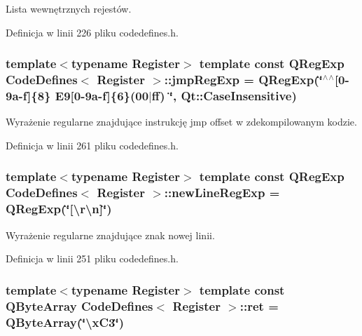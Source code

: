 Lista wewnętrznych rejestów. 



Definicja w linii 226 pliku codedefines.\-h.

\hypertarget{class_code_defines_a2f214288be4f17edf89f463162c59e30}{
\subsubsection[{jmp\-Reg\-Exp}]{\setlength{\rightskip}{0pt plus 5cm}template$<$typename Register$>$ template const Q\-Reg\-Exp {\bf Code\-Defines}$<$ Register $>$\-::jmp\-Reg\-Exp = Q\-Reg\-Exp(\char`\"{}$^\wedge$$^\wedge$\mbox{[}0-\/9a-\/f\mbox{]}\{8\} E9\mbox{[}0-\/9a-\/f\mbox{]}\{6\}(00$|$ff) \char`\"{}, Qt\-::\-Case\-Insensitive)\hspace{0.3cm}{\ttfamily [static]}}}\label{class_code_defines_a2f214288be4f17edf89f463162c59e30}


Wyrażenie regularne znajdujące instrukcję jmp offset w zdekompilowanym kodzie. 



Definicja w linii 261 pliku codedefines.\-h.

\hypertarget{class_code_defines_a767cf243acab61bf7c6f1046002425e1}{
\subsubsection[{new\-Line\-Reg\-Exp}]{\setlength{\rightskip}{0pt plus 5cm}template$<$typename Register$>$ template const Q\-Reg\-Exp {\bf Code\-Defines}$<$ Register $>$\-::new\-Line\-Reg\-Exp = Q\-Reg\-Exp(\char`\"{}\mbox{[}\textbackslash{}r\textbackslash{}n\mbox{]}\char`\"{})\hspace{0.3cm}{\ttfamily [static]}}}\label{class_code_defines_a767cf243acab61bf7c6f1046002425e1}


Wyrażenie regularne znajdujące znak nowej linii. 



Definicja w linii 251 pliku codedefines.\-h.

\hypertarget{class_code_defines_ae8c1690d0a6fe53c81dea4c8cad6ca5c}{
\subsubsection[{ret}]{\setlength{\rightskip}{0pt plus 5cm}template$<$typename Register$>$ template const Q\-Byte\-Array {\bf Code\-Defines}$<$ Register $>$\-::ret = Q\-Byte\-Array(\char`\"{}\textbackslash{}x\-C3\char`\"{})\hspace{0.3cm}{\ttfamily [static]}}}\label{class_code_defines_ae8c1690d0a6fe53c81dea4c8cad6ca5c}


